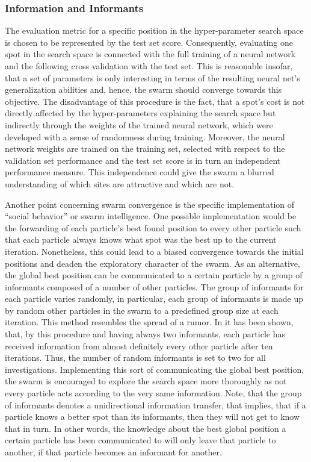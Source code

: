 \subsubsection{Information and Informants}
The evaluation metric for a specific position in the hyper-parameter search space is chosen to be represented by the test set score.
Consequently, evaluating one spot in the search space is connected with the full training of a neural network and the following cross validation with the test set.
This is reasonable insofar, that a set of parameters is only interesting in terms of the resulting neural net's generalization abilities and, hence, the swarm should converge towards this objective.
The disadvantage of this procedure is the fact, that a spot's cost is not directly affected by the hyper-parameters explaining the search space but indirectly through the weights of the trained neural network, which were developed with a sense of randomness during training.
Moreover, the neural network weights are trained on the training set, selected with respect to the validation set performance and the test set score is in turn an independent performance measure.
This independence could give the swarm a blurred understanding of which sites are attractive and which are not.

Another point concerning swarm convergence is the specific implementation of ``social behavior'' or swarm intelligence.
One possible implementation would be the forwarding of each particle's best found position to every other particle such that each particle always knows what spot was the best up to the current iteration.
Nonetheless, this could lead to a biased convergence towards the initial positions and deaden the exploratory character of the swarm.
As an alternative, the global best position can be communicated to a certain particle by a group of informants composed of a number of other particles.
The group of informants for each particle varies randomly, in particular, each group of informants is made up by random other particles in the swarm to a predefined group size at each iteration.
This method resembles the spread of a rumor.
In \cite{Clerc2006} it has been shown, that, by this procedure and having always two informants, each particle has received information from almost definitely every other particle after ten iterations.
Thus, the number of random informants is set to two for all investigations.
Implementing this sort of communicating the global best position, the swarm is encouraged to explore the search space more thoroughly as not every particle acts according to the very same information.
Note, that the group of informants denotes a unidirectional information transfer, that implies, that if a particle knows a better spot than its informants, then they will not get to know that in turn.
In other words, the knowledge about the best global position a certain particle has been communicated to will only leave that particle to another, if that particle becomes an informant for another.

